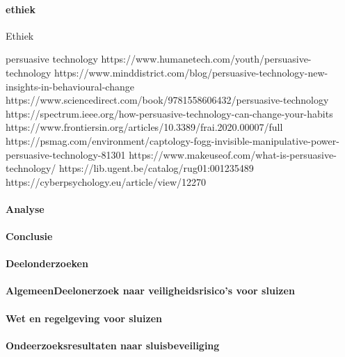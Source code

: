  
 
\paragraph{ethiek}


Ethiek 



persuasive technology 
https://www.humanetech.com/youth/persuasive-technology 
\cite{humanTechpersuasiveTech}
https://www.minddistrict.com/blog/persuasive-technology-new-insights-in-behavioural-change 
https://www.sciencedirect.com/book/9781558606432/persuasive-technology 
https://spectrum.ieee.org/how-persuasive-technology-can-change-your-habits 
\cite{rezenfeld01012018persuasiveTecgHabits}
https://www.frontiersin.org/articles/10.3389/frai.2020.00007/full 
\cite{aldenaini28042020persuasiveTechTrends}
https://psmag.com/environment/captology-fogg-invisible-manipulative-power-persuasive-technology-81301 
\cite{larson14062017persuasivetechmanipulates}
https://www.makeuseof.com/what-is-persuasive-technology/ 
\cite{tanzem22012022persuasivetechchanginglives}
https://lib.ugent.be/catalog/rug01:001235489 
https://cyberpsychology.eu/article/view/12270 
\cite{tikkakuddonenpersuasiveTechnology}




\paragraph{Analyse}
\paragraph{Conclusie}



\paragraph{Deelonderzoeken}

\paragraph{AlgemeenDeelonerzoek naar veiligheidsrisico's voor sluizen}
\paragraph{Wet en regelgeving voor sluizen}

\paragraph{Ondeerzoeksresultaten naar sluisbeveiliging}



